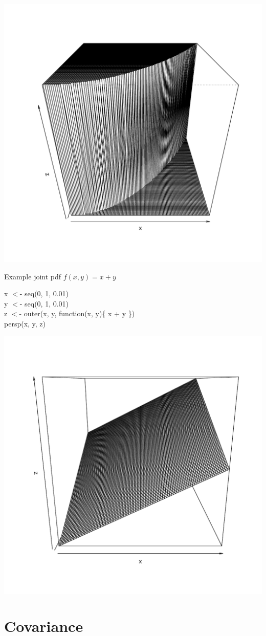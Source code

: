 \documentclass[aspectratio=169, handout]{beamer}
\numberwithin{equation}{section}
\begin{document}
\begin{frame}
\begin{center}
\includegraphics[width=3 in]{halfcircle.pdf}
\end{center}
\end{frame}


\begin{frame}{Example joint pdf $f(x,y)=x+y$}

x $<$- seq(0, 1, 0.01)\\
y $<$- seq(0, 1, 0.01)\\
z $<$- outer(x, y, function(x, y)\{ x + y \})\\
persp(x, y, z)

\end{frame}


\begin{frame}
\begin{center}
\includegraphics[width=3 in]{roof.pdf}
\end{center}
\end{frame}

\section{Covariance}
\end{document}
